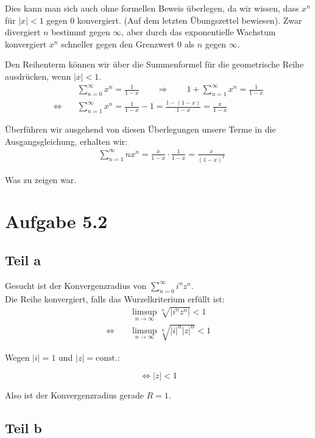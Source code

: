 \documentclass[a4paper,german,12pt,smallheadings]{scrartcl}
\begin{document}
Dies kann man sich auch ohne formellen Beweis überlegen, da wir wissen, dass
$x^n$ für $|x|<1$ gegen 0 konvergiert. (Auf dem letzten Übungszettel bewiesen).
Zwar divergiert $n$ bestimmt gegen $\infty$, aber durch das exponentielle
Wachstum konvergiert $x^n$ schneller gegen den Grenzwert 0 als $n$ gegen
$\infty$.

Den Reihenterm können wir über die Summenformel für die geometrische Reihe ausdrücken, wenn $|x| < 1$.
\begin{align*}
  &\sum_{n=0}^\infty x^n = \frac{1}{1-x} \qquad\Rightarrow\qquad 1 + \sum_{n=1}^\infty x^n= \frac{1}{1-x}\\ 
  \Leftrightarrow\quad & \sum_{n=1}^\infty x^n =\frac{1}{1-x} - 1 = \frac{1-\left(1-x\right)}{1-x}= \frac{x}{1-x}
\end{align*}


Überführen wir ausgehend von diesen Überlegungen unsere Terme in die Ausgangsgleichung, erhalten wir:
\begin{align*}
  &\sum_{n=1}^\infty nx^n = \frac{x}{1-x} \cdot \frac{1}{1-x} = \frac{x}{(1-x)^2}
\end{align*}

Was zu zeigen war.

\section*{Aufgabe 5.2}
\subsection*{Teil a}

Gesucht ist der Konvergenzradius von $\sum\limits_{n=0}^{\infty} i^nz^n$.\\
Die Reihe konvergiert, falls das Wurzelkriterium erfüllt ist:
\begin{align*}
  & \limsup\limits_{n \to \infty} \sqrt[n]{|i^nz^n|}<1\\
  \Leftrightarrow\quad&\limsup\limits_{n \to \infty} \sqrt[n]{|i|^n|z|^n}<1
\end{align*}

Wegen $|i|=1$ und $|z|= \text{const.}$:

\begin{equation*}
\Leftrightarrow |z|<1
\end{equation*}

Also ist der Konvergenzradius gerade $R=1$.

\subsection*{Teil b}
\end{document}
